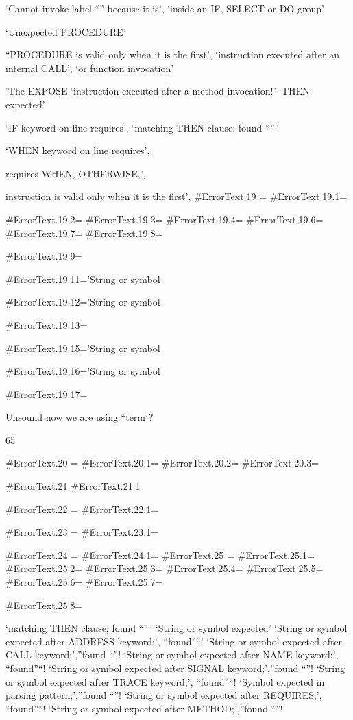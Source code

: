 `Cannot invoke label ``'' because it is', `inside an IF, SELECT or DO
group'

`Unexpected PROCEDURE'

``PROCEDURE is valid only when it is the first', `instruction executed
after an internal CALL', `or function invocation'

`The EXPOSE `instruction executed after a method invocation!' `THEN
expected'

`IF keyword on line requires', `matching THEN clause; found ``''\,'

`WHEN keyword on line requires',

requires WHEN, OTHERWISE,',

instruction is valid only when it is the first', \#ErrorText.19 =
\#ErrorText.19.1=

\#ErrorText.19.2= \#ErrorText.19.3= \#ErrorText.19.4= \#ErrorText.19.6=
\#ErrorText.19.7= \#ErrorText.19.8=

\#ErrorText.19.9=

\#ErrorText.19.11='String or symbol

\#ErrorText.19.12='String or symbol

\#ErrorText.19.13=

\#ErrorText.19.15='String or symbol

\#ErrorText.19.16='String or symbol

\#ErrorText.19.17=

Unsound now we are using ``term'?

65

\#ErrorText.20 = \#ErrorText.20.1= \#ErrorText.20.2= \#ErrorText.20.3=

\#ErrorText.21 \#ErrorText.21.1

\#ErrorText.22 = \#ErrorText.22.1=

\#ErrorText.23 = \#ErrorText.23.1=

\#ErrorText.24 = \#ErrorText.24.1= \#ErrorText.25 = \#ErrorText.25.1=
\#ErrorText.25.2= \#ErrorText.25.3= \#ErrorText.25.4= \#ErrorText.25.5=
\#ErrorText.25.6= \#ErrorText.25.7=

\#ErrorText.25.8=

`matching THEN clause; found ``''\,' `String or symbol expected' `String
or symbol expected after ADDRESS keyword;', ``found''``! `String or
symbol expected after CALL keyword;',''found ``''! `String or symbol
expected after NAME keyword;', ``found''``! `String or symbol expected
after SIGNAL keyword;',''found ``''! `String or symbol expected after
TRACE keyword;', ``found''``! `Symbol expected in parsing
pattern;',''found ``''! `String or symbol expected after REQUIRES;',
``found''``! `String or symbol expected after METHOD;',''found ``''!

